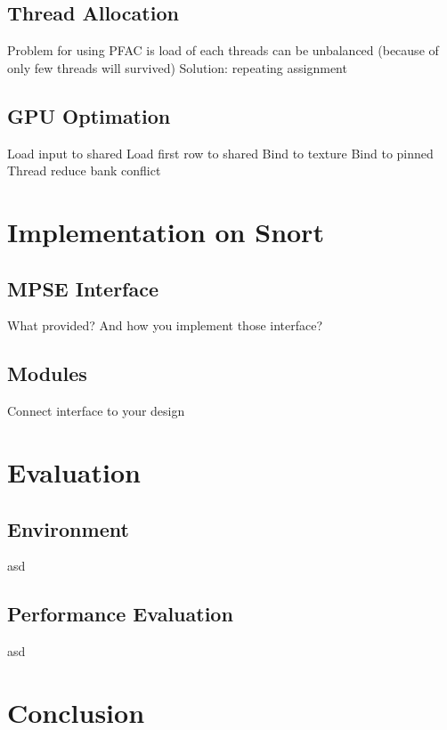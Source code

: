\documentclass[conference]{IEEEtran}
\begin{document}
    \subsection{Thread Allocation}
        Problem for using PFAC is load of each threads can be unbalanced (because of only few threads will survived)
        Solution: repeating assignment

    \subsection{GPU Optimation}
        Load input to shared
        Load first row to shared
        Bind to texture
        Bind to pinned
        Thread reduce bank conflict

\section{Implementation on Snort}
    \subsection{MPSE Interface}
        What provided? And how you implement those interface?

    \subsection{Modules}
        Connect interface to your design

\section{Evaluation}
    \subsection{Environment}
        asd
        
    \subsection{Performance Evaluation}
        asd

\section{Conclusion}

\end{document}
